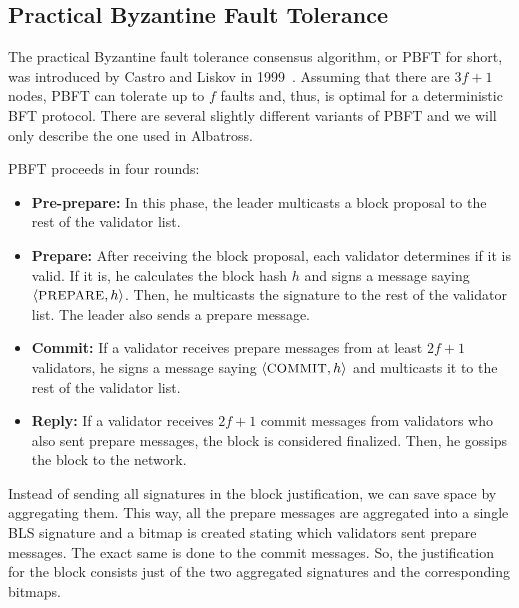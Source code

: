 \documentclass[conference]{IEEEtran}
\begin{document}
\subsection{Practical Byzantine Fault Tolerance} \label{pbft}
The practical Byzantine fault tolerance consensus algorithm, or PBFT for short, was introduced by Castro and Liskov in 1999~\cite{castro1999practical}. Assuming that there are $3f+1$ nodes, PBFT can tolerate up to $f$ faults and, thus, is optimal for a deterministic BFT protocol. There are several slightly different variants of PBFT and we will only describe the one used in Albatross.

PBFT proceeds in four rounds:
\begin{itemize}
	\item \textbf{Pre-prepare:} In this phase, the leader multicasts a block proposal to the rest of the validator list.
	\item \textbf{Prepare:} After receiving the block proposal, each validator determines if it is valid. If it is, he calculates the block hash $h$ and signs a message saying $\langle{\small\textsc{PREPARE}}, h\rangle$. Then, he multicasts the signature to the rest of the validator list. The leader also sends a prepare message.
	\item \textbf{Commit:} If a validator receives prepare messages from at least $2f+1$ validators, he signs a message saying $\langle{\small\textsc{COMMIT}}, h\rangle$ and multicasts it to the rest of the validator list.
	\item \textbf{Reply:} If a validator receives $2f+1$ commit messages from validators who also sent prepare messages, the block is considered finalized. Then, he gossips the block to the network.
\end{itemize}

Instead of sending all signatures in the block justification, we can save space by aggregating them. This way, all the prepare messages are aggregated into a single BLS signature and a bitmap is created stating which validators sent prepare messages. The exact same is done to the commit messages. So, the justification for the block consists just of the two aggregated signatures and the corresponding bitmaps.
\end{document}

